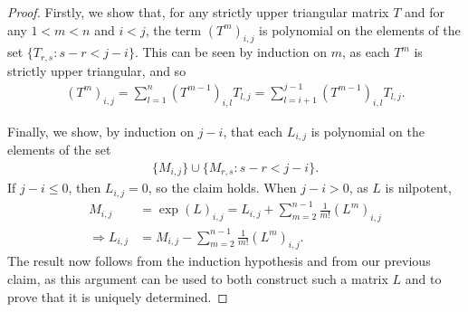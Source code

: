 \begin{proof}
Firstly, we show that, for any strictly upper triangular matrix $T$ and for any $1<m<n$ and $i<j$, the term $(T^{m})_{i,j}$ is polynomial on the elements of the set $\lbrace T_{r,s} : s-r<j-i \rbrace$. This can be seen by induction on $m$, as each $T^{m}$ is strictly upper triangular, and so
\begin{align*}
(T^{m})_{i,j} = \sum\limits_{l=1}^{n} (T^{m-1})_{i,l} T_{l,j} = \sum\limits_{l=i+1}^{j-1} (T^{m-1})_{i,l} T_{l,j} .
\end{align*}

Finally, we show, by induction on $j-i$, that each $L_{i,j}$ is polynomial on the elements of the set
\begin{align*}
\lbrace M_{i,j} \rbrace \cup \lbrace M_{r,s} : s-r < j-i \rbrace .
\end{align*}
If $j-i \leq 0$, then $L_{i,j}=0$, so the claim holds. When $j-i>0$, as $L$ is nilpotent,
\begin{align*}
M_{i,j} &= \exp(L)_{i,j} = L_{i,j} + \sum\limits_{m=2}^{n-1} \frac{1}{m!} (L^{m})_{i,j} \\ \Rightarrow L_{i,j} &= M_{i,j} - \sum\limits_{m=2}^{n-1} \frac{1}{m!} (L^{m})_{i,j} .
\end{align*}
The result now follows from the induction hypothesis and from our previous claim, as this argument can be used to both construct such a matrix $L$ and to prove that it is uniquely determined.
\end{proof}
